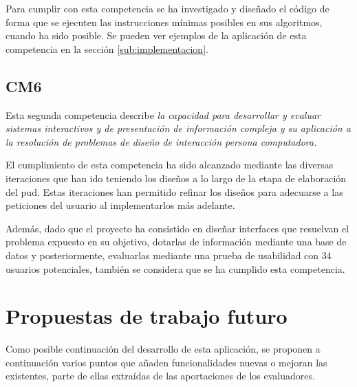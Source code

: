 Para cumplir con esta competencia se ha investigado y diseñado el código de forma que se ejecuten las instrucciones mínimas posibles en sus algoritmos, cuando ha sido posible. Se pueden ver ejemplos de la aplicación de esta competencia en la sección \ref{sub:implementacion}.


\subsection{CM6}
Esta segunda competencia describe \textit{la capacidad para desarrollar y evaluar sistemas interactivos y de presentación de información compleja y su aplicación a la resolución de problemas de diseño de interacción persona computadora.}

El cumplimiento de esta competencia ha sido alcanzado mediante las diversas iteraciones que han ido teniendo los diseños a lo largo de la etapa de elaboración del \gls{pud}. Estas iteraciones han permitido refinar los diseños para adecuarse a las peticiones del usuario al implementarlos más adelante.

Además, dado que el proyecto ha consistido en diseñar interfaces que resuelvan el problema expuesto en su objetivo, dotarlas de información mediante una base de datos y posteriormente, evaluarlas mediante una prueba de usabilidad con 34 usuarios potenciales, también se considera que se ha cumplido esta competencia.


\section{Propuestas de trabajo futuro}
\label{sec:trabajofuturo}
Como posible continuación del desarrollo de esta aplicación, se proponen a continuación varios puntos que añaden funcionalidades nuevas o mejoran las existentes, parte de ellas extraídas de las aportaciones de los evaluadores.

